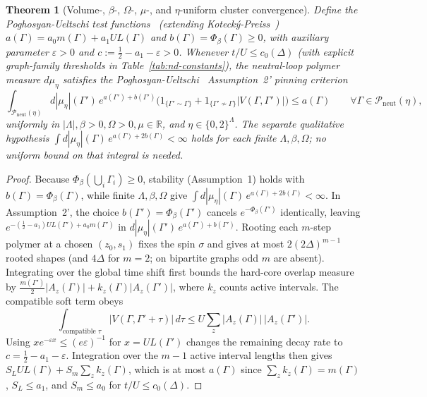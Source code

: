 \documentclass[11pt]{article}
\newtheorem{theorem}{Theorem}[section]
\theoremstyle{definition}
\theoremstyle{remark}
\newcommand{\R}{\mathbb{R}}
\begin{document}
\begin{theorem}[Volume-, $\beta$-, $\Omega$-, $\mu$-, and $\eta$-uniform cluster convergence]
\label{thm:nd-conv}
Define the Poghosyan-Ueltschi test functions~\cite{poghosyan2009} (extending Koteck\'y-Preiss~\cite{kotecky1986}) $a(\Gamma) = a_0 m(\Gamma) + a_1 U L(\Gamma)$
and $b(\Gamma) = \Phi_\beta(\Gamma) \ge 0$, with auxiliary parameter $\varepsilon > 0$
and $c := \frac{1}{2} - a_1 - \varepsilon > 0$.
Whenever $t/U \le c_0(\Delta)$ (with explicit graph-family thresholds in
Table~\ref{tab:nd-constants}), the neutral-loop polymer measure $d\mu_\eta$
satisfies the Poghosyan-Ueltschi~\cite{poghosyan2009} Assumption~2' pinning
criterion
\[
\int_{\mathcal{P}_{\mathrm{neut}}(\eta)} d|\mu_\eta|(\Gamma')\, e^{a(\Gamma') + b(\Gamma')}
\bigl(1_{\{\Gamma' \sim \Gamma\}} + 1_{\{\Gamma' \not\sim \Gamma\}} |V(\Gamma, \Gamma')|\bigr)
\le a(\Gamma) \qquad \forall \Gamma \in \mathcal{P}_{\mathrm{neut}}(\eta),
\]
uniformly in $|\Lambda|, \beta > 0, \Omega > 0, \mu \in \R$, and $\eta \in \{0,2\}^\Lambda$.
The separate qualitative hypothesis $\int d|\mu_\eta|(\Gamma)\,
e^{a(\Gamma)+2b(\Gamma)} < \infty$ holds for each finite $\Lambda,\beta,\Omega$;
no uniform bound on that integral is needed.
\end{theorem}

\begin{proof}
Because $\Phi_\beta(\bigcup_i \Gamma_i) \ge 0$, stability (Assumption~1) holds
with $b(\Gamma) = \Phi_\beta(\Gamma)$, while finite $\Lambda, \beta, \Omega$ give
$\int d|\mu_\eta|(\Gamma)\,e^{a(\Gamma)+2b(\Gamma)} < \infty$. In Assumption~2',
the choice $b(\Gamma') = \Phi_\beta(\Gamma')$ cancels $e^{-\Phi_\beta(\Gamma')}$
identically, leaving $e^{-(\frac{1}{2}-a_1) U L(\Gamma') + a_0 m(\Gamma')}$ in
$d|\mu_\eta|(\Gamma')\,e^{a(\Gamma')+b(\Gamma')}$. Rooting each $m$-step polymer
at a chosen $(z_0, s_1)$ fixes the spin $\sigma$ and gives at most
$2(2\Delta)^{m-1}$ rooted shapes (and $4\Delta$ for $m=2$; on bipartite graphs
odd $m$ are absent).
Integrating over the global time shift first bounds the hard-core overlap
measure by $\frac{m(\Gamma')}{2}|A_z(\Gamma)| + k_z(\Gamma)|A_z(\Gamma')|$,
where $k_z$ counts active intervals. The compatible soft term obeys
\[
\int_{\text{compatible }\tau}|V(\Gamma,\Gamma'+\tau)|\,d\tau
\le U\sum_z |A_z(\Gamma)|\,|A_z(\Gamma')|.
\]
Using $x e^{-\varepsilon x} \le (e\varepsilon)^{-1}$ for
$x=U L(\Gamma')$ changes the remaining decay rate to
$c=\frac{1}{2}-a_1-\varepsilon$. Integration over the $m-1$ active interval
lengths then gives $S_L U L(\Gamma)+S_m\sum_z k_z(\Gamma)$,
which is at most $a(\Gamma)$ since $\sum_z k_z(\Gamma)=m(\Gamma)$,
$S_L\le a_1$, and $S_m\le a_0$ for $t/U\le c_0(\Delta)$.
\end{proof}
\end{document}
